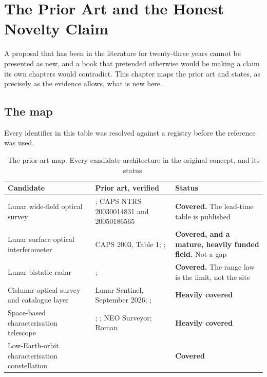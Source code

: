 
\chapter{The Prior Art and the Honest Novelty Claim}
\label{ch:prior-art}

A proposal that has been in the literature for twenty-three years cannot be
presented as new, and a book that pretended otherwise would be making a
claim its own chapters would contradict. This chapter maps the prior art
and states, as precisely as the evidence allows, what is new here.

\section{The map}

Every identifier in this table was resolved against a registry before the
reference was used.

\begin{table}[!htbp]
\centering
\footnotesize
\caption{The prior-art map. Every candidate architecture in the original
concept, and its status.}
\label{tab:prior-art}
\begin{tabularx}{\textwidth}{@{}P{1.15in}P{1.55in}Y@{}}
\toprule
{}
\textbf{Candidate} & \textbf{Prior art, verified} & \textbf{Status} \\
\midrule
Lunar wide-field optical survey &
; CAPS NTRS 20030014831 and 20050186565 &
\textbf{Covered.} The lead-time table is published \\
Lunar surface optical interferometer &
CAPS 2003, Table 1; ;  &
\textbf{Covered, and a mature, heavily funded field.} Not a gap \\
Lunar bistatic radar &
;  &
\textbf{Covered.} The range law is the limit, not the site \\
Cislunar optical survey and catalogue layer &
Lunar Sentinel, September 2026; ;
 &
\textbf{Heavily covered} \\
Space-based characterisation telescope &
; ; NEO Surveyor; Roman &
\textbf{Heavily covered} \\
Low-Earth-orbit characterisation constellation &
 &
\textbf{Covered} \\
\bottomrule
\end{tabularx}
\end{table}

